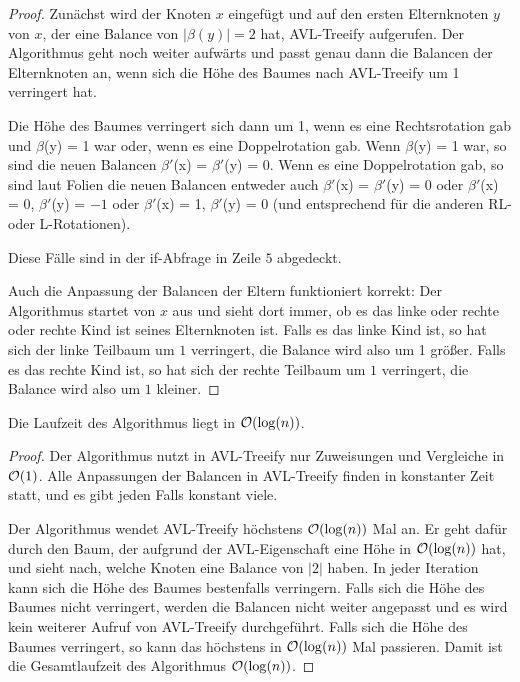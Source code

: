 \documentclass{scrartcl} %
\begin{document}
\begin{aufgabe}
\begin{enumerate}[label=]
\begin{proof}
                Zunächst wird der Knoten $x$ eingefügt und auf den ersten Elternknoten $y$ von $x$, der eine Balance von $\lvert \beta(y)\rvert = 2$ hat, {\ttfamily AVL-Treeify} aufgerufen.  Der Algorithmus geht noch weiter aufwärts und passt genau dann die Balancen der Elternknoten an, wenn sich die Höhe des Baumes nach {\ttfamily AVL-Treeify} um 1 verringert hat. 
                
                Die Höhe des Baumes verringert sich dann um 1, wenn es eine Rechtsrotation gab und $\beta$(y) = 1 war oder, wenn es eine Doppelrotation gab. Wenn $\beta$(y) = 1 war, so sind die neuen Balancen $\beta'$(x) = $\beta'$(y) = 0. Wenn es eine Doppelrotation gab, so sind laut Folien die neuen Balancen entweder auch $\beta'$(x) = $\beta'$(y) = 0 oder $\beta'$(x) = 0, $\beta'$(y) = $-1$ oder $\beta'$(x) = 1, $\beta'$(y) = 0 (und entsprechend für die anderen RL- oder L-Rotationen). 

                Diese Fälle sind in der {\ttfamily if}-Abfrage in Zeile $5$ abgedeckt.

                Auch die Anpassung der Balancen der Eltern funktioniert korrekt: Der Algorithmus startet von $x$ aus und sieht dort immer, ob es das linke oder rechte oder rechte Kind ist seines Elternknoten ist. Falls es das linke Kind ist, so hat sich der linke Teilbaum um $1$ verringert, die Balance wird also um 1 größer. Falls es das rechte Kind ist, so hat sich der rechte Teilbaum um $1$ verringert, die Balance wird also um $1$ kleiner.
            \end{proof}
            \begin{theorem*}
                Die Laufzeit des Algorithmus liegt in $\operatorname{\mathcal{O}}(\log(n))$.
            \end{theorem*}
            \begin{proof}
                Der Algorithmus nutzt in {\ttfamily AVL-Treeify} nur Zuweisungen und Vergleiche in $\operatorname{\mathcal{O}}(1)$. Alle Anpassungen der Balancen in {\ttfamily AVL-Treeify} finden in konstanter Zeit statt, und es gibt jeden Falls konstant viele.

                Der Algorithmus wendet {\ttfamily AVL-Treeify} höchstens $\operatorname{\mathcal{O}}(\log(n))$ Mal an. Er geht dafür durch den Baum, der aufgrund der AVL-Eigenschaft eine Höhe in $\operatorname{\mathcal{O}}(\log(n))$ hat, und sieht nach, welche Knoten eine Balance von $\lvert 2\rvert$ haben. In jeder Iteration kann sich die Höhe des Baumes bestenfalls verringern. Falls sich die Höhe des Baumes nicht verringert, werden die Balancen nicht weiter angepasst und es wird kein weiterer Aufruf von {\ttfamily AVL-Treeify} durchgeführt. Falls sich die Höhe des Baumes verringert, so kann das höchstens in $\operatorname{\mathcal{O}}(\log(n))$ Mal passieren. Damit ist die Gesamtlaufzeit des Algorithmus $\operatorname{\mathcal{O}}(\log(n))$.
            \end{proof}
        \end{enumerate}
    \end{aufgabe}
\end{document}
